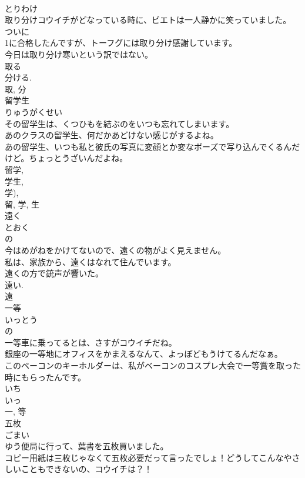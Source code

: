 \documentclass[8pt]{extreport}
\begin{document}
\begin{CJK}{UTF8}{min}
\\	とりわけ	
\\	取り分けコウイチがどなっている時に、ビエトは一人静かに笑っていました。	
\\	ついに
\\	1に合格したんですが、トーフグには取り分け感謝しています。	
\\	今日は取り分け寒いという訳ではない。	
\\	取る 
\\	分ける. 
\\	取, 分	
\\	留学生	
\\	りゅうがくせい	
\\	その留学生は、くつひもを結ぶのをいつも忘れてしまいます。	
\\	あのクラスの留学生、何だかあどけない感じがするよね。	
\\	あの留学生、いつも私と彼氏の写真に変顔とか変なポーズで写り込んでくるんだけど。ちょっとうざいんだよね。	
\\	留学, 
\\	学生, 
\\	学), 
\\	留, 学, 生	
\\	遠く	
\\	とおく	
\\	の 
\\	今はめがねをかけてないので、遠くの物がよく見えません。	
\\	私は、家族から、遠くはなれて住んでいます。	
\\	遠くの方で銃声が響いた。	
\\	遠い. 
\\	遠	
\\	一等	
\\	いっとう	
\\	の 
\\	一等車に乗ってるとは、さすがコウイチだね。	
\\	銀座の一等地にオフィスをかまえるなんて、よっぽどもうけてるんだなぁ。	
\\	このベーコンのキーホルダーは、私がベーコンのコスプレ大会で一等賞を取った時にもらったんです。	
\\	いち 
\\	いっ 
\\	一, 等	
\\	五枚	
\\	ごまい	
\\	ゆう便局に行って、葉書を五枚買いました。	
\\	コピー用紙は三枚じゃなくて五枚必要だって言ったでしょ！どうしてこんなやさしいこともできないの、コウイチは？！	

\end{CJK}
\end{document}
